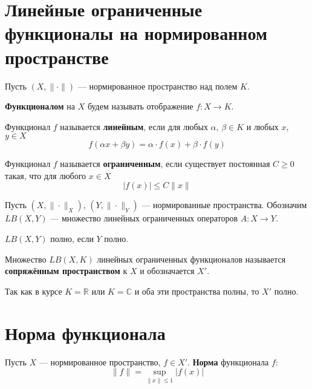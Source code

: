 \documentclass[12pt]{article}
\newtheorem{theorem}{\hskip\parindent Теорема}%
\newtheorem{definition}{\hskip\parindent Определение}%
\begin{document}
\section{Линейные ограниченные функционалы на нормированном пространстве}
Пусть $(X,\|\cdot\|)$ --- нормированное пространство над полем $K$.
\begin{definition}
	\textbf{Функционалом} на $X$ будем называть отображение $f: X\to K$.
\end{definition}
\begin{definition}
	Функционал $f$ называется \textbf{линейным}, если для любых $\alpha$, $\beta\in K$ и любых $x$, $y\in X$
	\begin{equation*}
		f(\alpha x+\beta y)=\alpha\cdot f(x)+\beta\cdot f(y)
	\end{equation*}
\end{definition}
\begin{definition}
	Функционал $f$ называется \textbf{ограниченным}, если существует постоянная $C\geqslant0$ такая, что для любого $x\in X$
	\begin{equation*}
		|f(x)|\leqslant C\|x\|
	\end{equation*}
\end{definition}

Пусть $(X,\|\cdot\|_X)$, $(Y,\|\cdot\|_Y)$ --- нормированные пространства. Обозначим $LB(X,Y)$ --- множество линейных ограниченных операторов $A:X\to Y$.
\begin{theorem}
$LB(X,Y)$ полно, если $Y$ полно.
\end{theorem}

Множество $LB(X,K)$ линейных ограниченных функционалов называется \textbf{сопряжённым пространством} к $X$ и обозначается $X'$.

Так как в курсе $K=\mathbb{R}$ или $K=\mathbb{C}$ и оба эти пространства полны, то $X'$ полно.
\section{Норма функционала}
\begin{definition}
	Пусть $X$ --- нормированное пространство, $f\in X'$. \textbf{Норма} функционала $f$:
	\begin{equation*}
		\|f\|=\sup\limits_{\|x\|\leqslant1}|f(x)|
	\end{equation*}
\end{definition}
\begin{theorem}

\end{theorem}
\end{document}
